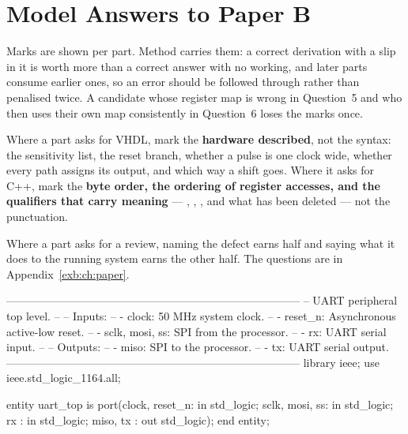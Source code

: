 
\renewcommand{\answerprefix}{ansb}

\chapter{Model Answers to Paper B}
\label{ansb:ch:answers}

Marks are shown per part. Method carries them: a correct derivation with a slip in it is worth more
than a correct answer with no working, and later parts consume earlier ones, so an error should be
followed through rather than penalised twice. A candidate whose register map is wrong in Question~5
and who then uses their own map consistently in Question~6 loses the marks once.

Where a part asks for VHDL, mark the \textbf{hardware described}, not the syntax: the sensitivity
list, the reset branch, whether a pulse is one clock wide, whether every path assigns its output,
and which way a shift goes. Where it asks for C++, mark the \textbf{byte order, the ordering of
register accesses, and the qualifiers that carry meaning} --- , ,
, and what has been deleted --- not the punctuation.

Where a part asks for a review, naming the defect earns half and saying what it does to the running
system earns the other half. The questions are in Appendix~\ref{exb:ch:paper}.


\begin{vhdlcode}
--------------------------------------------------------------------------------
-- UART peripheral top level.
--
-- Inputs:
--    - clock: 50 MHz system clock.
--    - reset_n: Asynchronous active-low reset.
--    - sclk, mosi, ss: SPI from the processor.
--    - rx: UART serial input.
--
-- Outputs:
--    - miso: SPI to the processor.
--    - tx: UART serial output.
--------------------------------------------------------------------------------
library ieee;
use ieee.std_logic_1164.all;

entity uart_top is
    port(clock, reset_n: in std_logic;
         sclk, mosi, ss: in std_logic;
         rx            : in std_logic;
         miso, tx      : out std_logic);
end entity;
\end{vhdlcode}

